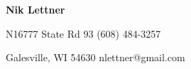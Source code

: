 \Large
\textbf{Nik Lettner}

\vspace{5mm}

\large
N16777 State Rd 93
\hfill
(608) 484-3257 

Galesville, WI 54630
\hfill
nlettner@gmail.com
